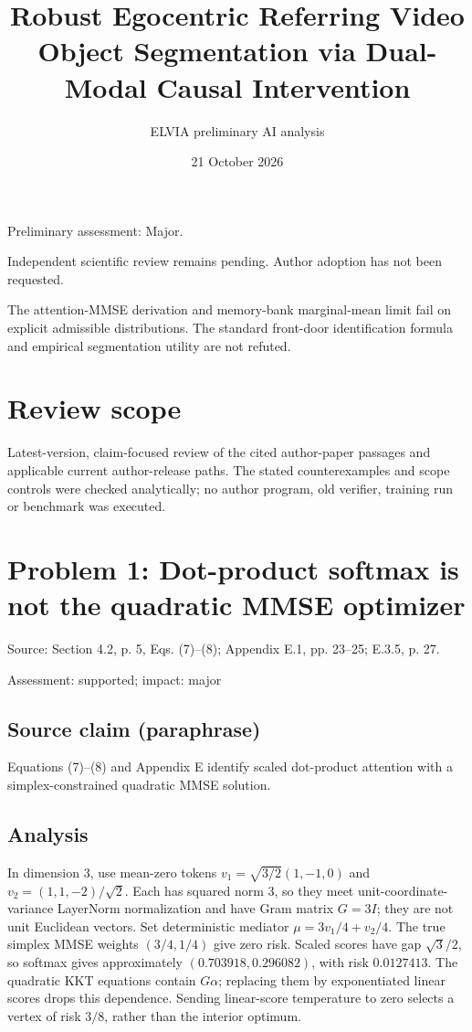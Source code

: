 \documentclass[11pt]{article}
\begin{document}
\title{Robust Egocentric Referring Video Object Segmentation via Dual-Modal Causal Intervention}

\author{ELVIA preliminary AI analysis}\date{21 October 2026}\maketitle

Preliminary assessment: Major.\par

Independent scientific review remains pending. Author adoption has not been requested.

The attention-MMSE derivation and memory-bank marginal-mean limit fail on explicit admissible distributions. The standard front-door identification formula and empirical segmentation utility are not refuted.

\section*{Review scope}

Latest-version, claim-focused review of the cited author-paper passages and applicable current author-release paths. The stated counterexamples and scope controls were checked analytically; no author program, old verifier, training run or benchmark was executed.

\section*{Problem 1: Dot-product softmax is not the quadratic MMSE optimizer}

Source: Section 4.2, p. 5, Eqs. (7)–(8); Appendix E.1, pp. 23–25; E.3.5, p. 27.

Assessment: supported; impact: major

\subsection*{Source claim (paraphrase)}

Equations (7)–(8) and Appendix E identify scaled dot-product attention with a simplex-constrained quadratic MMSE solution.

\subsection*{Analysis}

In dimension \(3\), use mean-zero tokens \(v_1=\sqrt{3/2}(1,-1,0)\) and \(v_2=(1,1,-2)/\sqrt2\). Each has squared norm \(3\), so they meet unit-coordinate-variance LayerNorm normalization and have Gram matrix \(G=3I\); they are not unit Euclidean vectors. Set deterministic mediator \(\mu=3v_1/4+v_2/4\). The true simplex MMSE weights \((3/4,1/4)\) give zero risk. Scaled scores have gap \(\sqrt3/2\), so softmax gives approximately \((0.703918,0.296082)\), with risk \(0.0127413\). The quadratic KKT equations contain \(G\alpha\); replacing them by exponentiated linear scores drops this dependence. Sending linear-score temperature to zero selects a vertex of risk \(3/8\), rather than the interior optimum.
\end{document}
